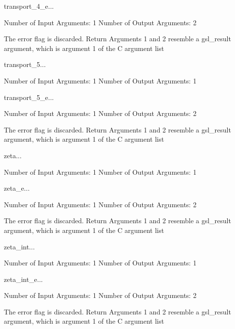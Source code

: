 \begin{funcdesc}{transport_4_e}{...}

    Number of Input  Arguments:  1
    Number of Output Arguments:  2

The error flag is discarded.
Return Arguments 1 and 2 resemble a gsl_result argument,
	which is  argument 1 of the C argument list

\end{funcdesc}

\begin{funcdesc}{transport_5}{...}

    Number of Input  Arguments:  1
    Number of Output Arguments:  1
\end{funcdesc}

\begin{funcdesc}{transport_5_e}{...}

    Number of Input  Arguments:  1
    Number of Output Arguments:  2

The error flag is discarded.
Return Arguments 1 and 2 resemble a gsl_result argument,
	which is  argument 1 of the C argument list

\end{funcdesc}

\begin{funcdesc}{zeta}{...}

    Number of Input  Arguments:  1
    Number of Output Arguments:  1
\end{funcdesc}

\begin{funcdesc}{zeta_e}{...}

    Number of Input  Arguments:  1
    Number of Output Arguments:  2

The error flag is discarded.
Return Arguments 1 and 2 resemble a gsl_result argument,
	which is  argument 1 of the C argument list

\end{funcdesc}

\begin{funcdesc}{zeta_int}{...}

    Number of Input  Arguments:  1
    Number of Output Arguments:  1
\end{funcdesc}

\begin{funcdesc}{zeta_int_e}{...}

    Number of Input  Arguments:  1
    Number of Output Arguments:  2

The error flag is discarded.
Return Arguments 1 and 2 resemble a gsl_result argument,
	which is  argument 1 of the C argument list

\end{funcdesc}

